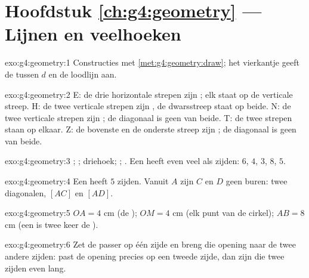 \section*{Hoofdstuk \ref{ch:g4:geometry} --- Lijnen en veelhoeken}

\begin{solution}{exo:g4:geometry:1}
Constructies met \cref{met:g4:geometry:draw}; het vierkantje geeft de
 tussen $d$ en de loodlijn aan.
\end{solution}

\begin{solution}{exo:g4:geometry:2}
E: de drie horizontale strepen zijn ; elk staat  op de
verticale streep. H: de twee verticale strepen zijn , de dwarsstreep
staat  op beide. N: de twee verticale strepen zijn ; de
diagonaal is geen van beide. T: de twee strepen staan  op elkaar.
Z: de bovenste en de onderste streep zijn ; de diagonaal is geen van
beide.
\end{solution}

\begin{solution}{exo:g4:geometry:3}
; ; driehoek; ; . Een  heeft even
veel  als zijden: $6$, $4$, $3$, $8$, $5$.
\end{solution}

\begin{solution}{exo:g4:geometry:4}
Een  heeft $5$ zijden. Vanuit $A$ zijn $C$ en $D$ geen buren: twee
diagonalen, $[AC]$ en $[AD]$.
\end{solution}

\begin{solution}{exo:g4:geometry:5}
$OA = 4$ cm (de ); $OM = 4$ cm (elk punt van de cirkel); $AB = 8$ cm
(een  is twee keer de ).
\end{solution}

\begin{solution}{exo:g4:geometry:6}
Zet de passer op één zijde en breng die opening naar de twee andere zijden:
past de opening precies op een tweede zijde, dan zijn die twee zijden even
lang.
\end{solution}

